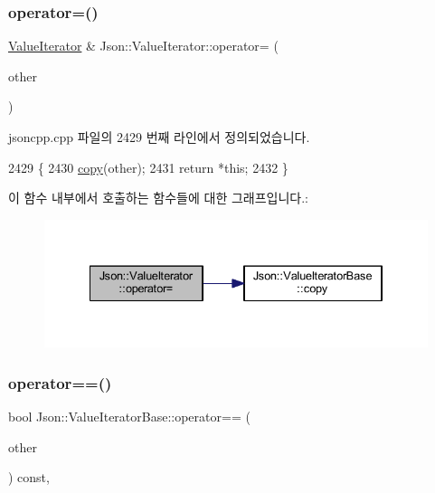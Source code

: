 \subsubsection{\texorpdfstring{operator=()}{operator=()}}
{\footnotesize\ttfamily \hyperlink{class_json_1_1_value_iterator}{Value\+Iterator} \& Json\+::\+Value\+Iterator\+::operator= (\begin{DoxyParamCaption}\item[{const \hyperlink{class_json_1_1_value_iterator_base_a9d2a940d03ea06d20d972f41a89149ee}{Self\+Type} \&}]{other }\end{DoxyParamCaption})}



jsoncpp.\+cpp 파일의 2429 번째 라인에서 정의되었습니다.


\begin{DoxyCode}
2429                                                              \{
2430   \hyperlink{class_json_1_1_value_iterator_base_a496e6aba44808433ec5858c178be5719}{copy}(other);
2431   \textcolor{keywordflow}{return} *\textcolor{keyword}{this};
2432 \}
\end{DoxyCode}
이 함수 내부에서 호출하는 함수들에 대한 그래프입니다.\+:\nopagebreak
\begin{figure}[H]
\begin{center}
\leavevmode
\includegraphics[width=334pt]{class_json_1_1_value_iterator_a8e23312b1db874f7e403fd7e76611bdc_cgraph}
\end{center}
\end{figure}
\mbox{\label{class_json_1_1_value_iterator_base_a1248d8016f88b51371a0fcbd355b3cfd}} 
\subsubsection{\texorpdfstring{operator==()}{operator==()}}
{\footnotesize\ttfamily bool Json\+::\+Value\+Iterator\+Base\+::operator== (\begin{DoxyParamCaption}\item[{const \hyperlink{class_json_1_1_value_iterator_base_a9d2a940d03ea06d20d972f41a89149ee}{Self\+Type} \&}]{other }\end{DoxyParamCaption}) const\hspace{0.3cm}{\ttfamily [inline]}, {\ttfamily [inherited]}}



